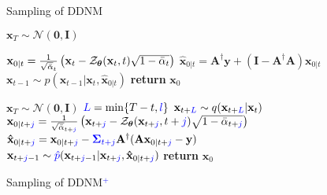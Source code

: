 \documentclass{article} \usepackage{iclr2023_conference,times}
\begin{document}
\begin{figure}
\begin{minipage}{.39\textwidth}
    \vspace{-0.5cm}
    \begin{algorithm}[H]
    \scriptsize
    \caption{Sampling of DDNM}
    \label{alg:ndm}
    \begin{algorithmic}[1]
        \State $\mathbf{x}_{T}\sim\mathcal{N}(\mathbf{0},\mathbf{I})$
            \item[]
            \item[]
            \item[]
            \State $\mathbf{x}_{0|t} = \frac{1}{\sqrt{\Bar{\alpha}}_{t}}	\left( \mathbf{x}_{t} - \mathcal{Z}_{\boldsymbol{\theta}}(\mathbf{x}_{t},t)\sqrt{1-\Bar{\alpha}_{t}} \right)$
            \State $ \hat{\mathbf{x}}_{0|t} = \mathbf{A}^{\dagger}\mathbf{y} + (\mathbf{I} - \mathbf{A}^{\dagger}\mathbf{A})\mathbf{x}_{0|t}$
            \State $\mathbf{x}_{t-1}\sim p(\mathbf{x}_{t-1}|\mathbf{x}_{t},\hat{\mathbf{x}}_{0|t})$
        \EndFor
        \State \textbf{return} $\mathbf{x}_{0}$
    \end{algorithmic}
    \end{algorithm}
\end{minipage}
\begin{minipage}{.59\textwidth}
    \vspace{-0.5cm}
        \begin{algorithm}[H]
        \scriptsize
        \caption{Sampling of DDNM\textcolor{blue}{$^+$}}
        \label{alg:ndm+}
        \begin{algorithmic}[1] \State $\mathbf{x}_{T}\sim\mathcal{N}(\mathbf{0},\mathbf{I})$
                    \State $\textcolor{blue}{L} = \min\{T-t, \textcolor{blue}{l}\}$
                    \State $\mathbf{x}_{t+\textcolor{blue}{L}}\sim q(\mathbf{x}_{t+\textcolor{blue}{L}}|\mathbf{x}_{t})$
\State $\mathbf{x}_{0|t+\textcolor{blue}{j}} = \frac{1}{\sqrt{\Bar{\alpha}}_{t+\textcolor{blue}{j}}}	\left( \mathbf{x}_{t+\textcolor{blue}{j}} - \mathcal{Z}_{\boldsymbol{\theta}}(\mathbf{x}_{t+\textcolor{blue}{j}},t+\textcolor{blue}{j})\sqrt{1-\Bar{\alpha}_{t+\textcolor{blue}{j}}} \right)$
                        \State $\mathbf{\hat{x}}_{0|t+\textcolor{blue}{j}} = \mathbf{x}_{0|t+\textcolor{blue}{j}} - \textcolor{blue}{\mathbf{\Sigma}_{t+\textcolor{blue}{j}}} \mathbf{A}^{\dagger}(\mathbf{A}\mathbf{x}_{0|t+\textcolor{blue}{j}}-\mathbf{y})$
                        \State$\mathbf{x}_{t+\textcolor{blue}{j}-1}\sim\textcolor{blue}{\hat{p}}(\mathbf{x}_{t+\textcolor{blue}{j}-1}|\mathbf{x}_{t+\textcolor{blue}{j}},\mathbf{\hat{x}}_{0|t+\textcolor{blue}{j}})$
                \EndFor
            \EndFor
        \State \textbf{return} $\mathbf{x}_{0}$
        \end{algorithmic}
        \end{algorithm}
\end{minipage}
\vspace{-0.5em}
\end{figure}
\end{document}
